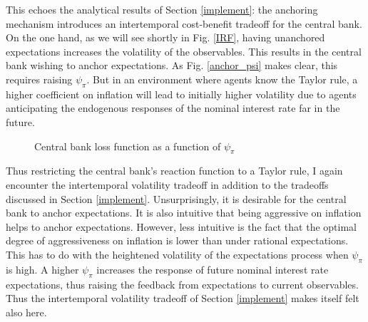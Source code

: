\documentclass[11pt]{article}
\def \myFigPath {../../figures/}
\renewcommand{\[}{\begin{equation}}
\renewcommand{\]}{\end{equation}}
\def\mySmallerFigScale{0.18}
\begin{document}
This echoes the analytical results of Section \ref{implement}: the anchoring mechanism introduces an intertemporal cost-benefit tradeoff for the central bank. On the one hand, as we will see shortly in Fig. \ref{IRF}, having unanchored expectations increases the volatility of the observables. This results in the central bank wishing to anchor expectations. As Fig. \ref{anchor_psi} makes clear, this requires raising $\psi_{\pi}$. But in an environment where agents know the Taylor rule, a higher coefficient on inflation will lead to initially higher volatility due to agents anticipating the endogenous responses of the nominal interest rate far in the future.

\begin{figure}[h!]
\caption{Central bank loss function as a function of $\psi_{\pi}$}
\label{fig_loss}
\end{figure}


Thus restricting the central bank's reaction function to a Taylor rule, I again encounter the intertemporal volatility tradeoff in addition to the tradeoffs discussed in Section \ref{implement}. Unsurprisingly, it is desirable for the central bank to anchor expectations. It is also intuitive that being aggressive on inflation helps to anchor expectations. However, less intuitive is the fact that the optimal degree of aggressiveness on inflation is lower than under rational expectations. This has to do with the heightened volatility of the expectations process when $\psi_{\pi}$ is high. A higher $\psi_{\pi}$ increases the response of future nominal interest rate expectations, thus raising the feedback from expectations to current observables. Thus the intertemporal volatility tradeoff of Section \ref{implement} makes itself felt also here.
\end{document}

